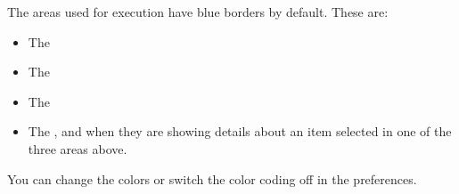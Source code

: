 The areas used for execution have blue borders by default. These are:
\begin{itemize}
\item The \gdtestsuitebrowser{}
\item The \gdtestsuiteeditor{}
\item The \gdtestresultview{}
\item The \gdpropview{}, \gdcompnamesview{} and \gddatasetsview{} when they are showing details about an item selected in one of the three areas above.
\end{itemize}

You can change the colors or switch the color coding off in the  preferences. 

 

